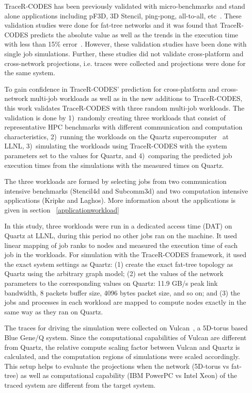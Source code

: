 
TraceR-CODES has been previously validated with micro-benchmarks and stand alone
applications including pF3D, 3D Stencil, ping-pong, all-to-all,
etc~\cite{Jain:sc2017}. These validation studies were done for fat-tree networks
and it was found that TraceR-CODES predicts the absolute value as well as the
trends in the execution time with less than 15\%
error~\cite{Jain:sc2017,acun:padabs2015}.  However, these validation studies 
have been done with single job simulations. Further, these studies did not
validate cross-platform and cross-network projections, i.e. traces were
collected and projections were done for the same system.

To gain confidence in TraceR-CODES' prediction for cross-platform and
cross-network multi-job workloads as well
as in the new additions to TraceR-CODES, this work validates TraceR-CODES with three random
multi-job workloads.
The validation is done by 1)~randomly creating three workloads that consist of 
representative HPC benchmarks with different communication and computation
characteristics, 2)~running the workloads on the Quartz supercomputer~\cite{quartz} at LLNL,
3)~simulating the workloads using TraceR-CODES with the system parameters
set to the values for Quartz, and 4)~comparing the predicted job execution
times from the simulations with the measured times on Quartz. 

The three workloads are formed by selecting jobs from two communication intensive
benchmarks (Stencil4d and Subcomm3d) and two computation intensive applications
(Kripke and Laghos). More information about the applications is given in
section ~\ref{applicationworkload} 

In this study, three workloads were run in a dedicated access time (DAT) on Quartz at LLNL, during this period
no other jobs ran on the machine. It used linear mapping of job
ranks to nodes and measured the execution time of each job in the workloads.
For simulation with the TraceR-CODES framework, it used the
exact system settings as Quartz: (1)  create
the exact fat-tree topology as Quartz using the arbitrary graph model; (2)
 set the values of the network parameters to the corresponding values on Quartz:
11.9 GB/s peak link bandwidth, 8 packets buffer size, 4096 bytes packet size,
and so on; and (3) the jobs and processes in each workload
are mapped to compute nodes exactly in the same
way as they ran on Quartz. 

The traces for driving the simulation were collected on
Vulcan~\cite{vulcan}, a 5D-torus based Blue Gene/Q
system.  Since the computational capabilities of Vulcan are different from
Quartz, the relative compute scaling factor between Vulcan and
Quartz is calculated, and the computation regions of simulations were scaled accordingly. This
setup helps to evaluate the projections when the network (5D-torus vs fat-tree)
as well as computational capability (IBM PowerPC vs Intel Xeon) of the traced
system are different from the target system.

